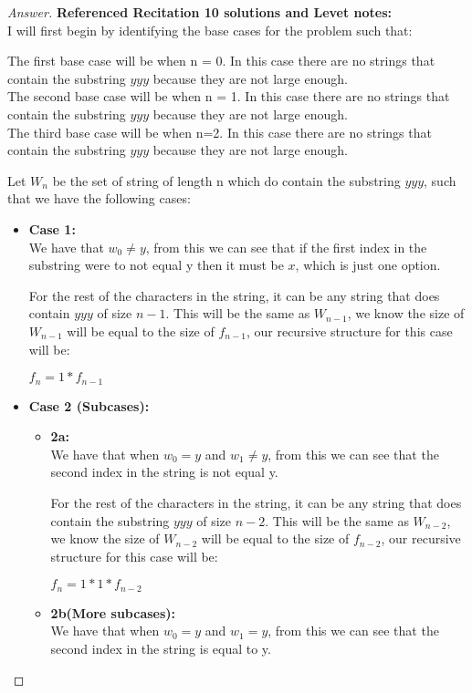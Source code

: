 \documentclass[11pt]{article}
\theoremstyle{definition}
\theoremstyle{definition}
\theoremstyle{definition}
\begin{document}
\begin{proof}[Answer] \textbf{Referenced Recitation 10 solutions and Levet notes:} \\
I will first begin by identifying the base cases for the problem such that: \\
\begin{center}
The first base case will be when n = 0. In this case there are no strings that contain the substring $yyy$ because they are not large enough.\\
The second base case will be when n = 1. In this case there are no strings that contain the substring $yyy$ because they are not large enough.\\
The third base case will be when n=2. In this case there are no strings that contain the substring $yyy$ because they are not large enough.
\end{center}
Let $W_n$ be the set of string of length n which do contain the substring $yyy$, such that we have the following cases: \\
\begin{itemize}
\item \textbf{Case 1:} \\
We have that $w_0 \neq y$, from this we can see that if the first index in the substring were to not equal y then it must be $x$, which is just one option.

For the rest of the characters in the string, it can be any string that does contain $yyy$ of size $n-1$. This will be the same as $W_{n-1}$, we know the size of $W_{n-1}$ will be equal to the size of $f_{n-1}$, our recursive structure for this case will be: \\
\begin{center}
$f_n = 1 * f_{n-1}$
\end{center}
\item \textbf{Case 2 (Subcases):} \\
\begin{itemize}
\item \textbf{2a:} \\
We have that when $w_0 = y$ and $w_1 \neq y$, from this we can see that the second index in the string is not equal y.

For the rest of the characters in the string, it can be any string that does contain the substring $yyy$ of size $n-2$. This will be the same as $W_{n-2}$, we know the size of $W_{n-2}$ will be equal to the size of $f_{n-2}$, our recursive structure for this case will be: \\
\begin{center}
$f_n = 1 * 1 * f_{n-2}$
\end{center}
\item \textbf{2b(More subcases):} \\
We have that when $w_0 = y$ and $w_1 = y$, from this we can see that the second index in the string is equal to y.


\end{itemize}
\end{itemize}
\end{proof}
\end{document}
